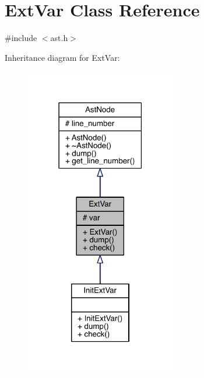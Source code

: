 \hypertarget{class_ext_var}{}\section{Ext\+Var Class Reference}
\label{class_ext_var}


{\ttfamily \#include $<$ast.\+h$>$}



Inheritance diagram for Ext\+Var\+:\nopagebreak
\begin{figure}[H]
\begin{center}
\leavevmode
\includegraphics[width=186pt]{class_ext_var__inherit__graph}
\end{center}
\end{figure}


